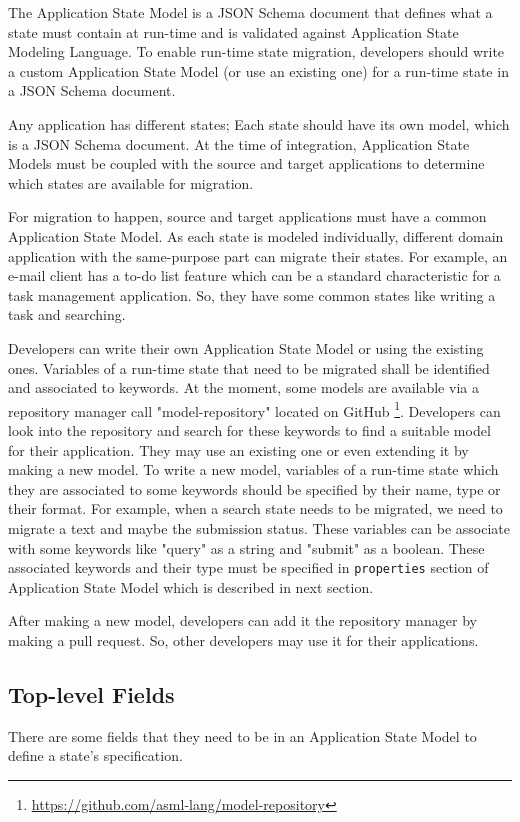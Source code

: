 
The Application State Model is a JSON Schema document that defines what a state must contain at run-time and is validated against Application State Modeling Language. To enable run-time state migration, developers should write a custom Application State Model (or use an existing one) for a run-time state in a JSON Schema document.

Any application has different states; Each state should have its own model, which is a JSON Schema document. At the time of integration, Application State Models must be coupled with the source and target applications to determine which states are available for migration.

For migration to happen, source and target applications must have a common Application State Model. As each state is modeled individually, different domain application with the same-purpose part can migrate their states. For example, an e-mail client has a to-do list feature which can be a standard characteristic for a task management application. So, they have some common states like writing a task and searching.

Developers can write their own Application State Model or using the existing ones. Variables of a run-time state that need to be migrated shall be identified and associated to keywords. At the moment, some models are available via a repository manager call "model-repository" located on GitHub \footnote{\href{https://github.com/asml-lang/model-repository}{https://github.com/asml-lang/model-repository}}. Developers can look into the repository and search for these keywords to find a suitable model for their application. They may use an existing one or even extending it by making a new model. To write a new model, variables of a run-time state which they are associated to some keywords should be specified by their name, type or their format. For example, when a search state needs to be migrated, we need to migrate a text and maybe the submission status. These variables can be associate with some keywords like "query" as a string and "submit" as a boolean. These associated keywords and their type must be specified in \lstinline[basicstyle=\ttfamily]{properties} section of Application State Model which is described in next section. 

After making a new model, developers can add it the repository manager by making a pull request. So, other developers may use it for their applications.

\subsection{Top-level Fields}
There are some fields that they need to be in an Application State Model to define a state’s specification.

